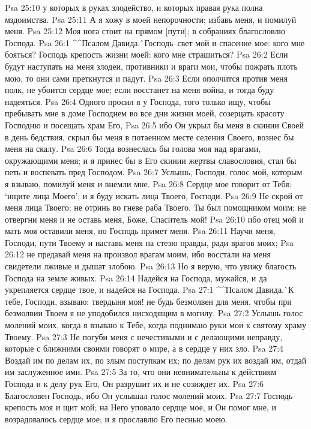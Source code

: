 Psa 25:10  у которых в руках злодейство, и которых правая рука полна мздоимства.
Psa 25:11  А я хожу в моей непорочности; избавь меня, и помилуй меня.
Psa 25:12  Моя нога стоит на прямом [пути]; в собраниях благословлю Господа.
Psa 26:1  ^^Псалом Давида.^^ Господь--свет мой и спасение мое: кого мне бояться? Господь крепость жизни моей: кого мне страшиться?
Psa 26:2  Если будут наступать на меня злодеи, противники и враги мои, чтобы пожрать плоть мою, то они сами преткнутся и падут.
Psa 26:3  Если ополчится против меня полк, не убоится сердце мое; если восстанет на меня война, и тогда буду надеяться.
Psa 26:4  Одного просил я у Господа, того только ищу, чтобы пребывать мне в доме Господнем во все дни жизни моей, созерцать красоту Господню и посещать храм Его,
Psa 26:5  ибо Он укрыл бы меня в скинии Своей в день бедствия, скрыл бы меня в потаенном месте селения Своего, вознес бы меня на скалу.
Psa 26:6  Тогда вознеслась бы голова моя над врагами, окружающими меня; и я принес бы в Его скинии жертвы славословия, стал бы петь и воспевать пред Господом.
Psa 26:7  Услышь, Господи, голос мой, которым я взываю, помилуй меня и внемли мне.
Psa 26:8  Сердце мое говорит от Тебя: `ищите лица Моего'; и я буду искать лица Твоего, Господи.
Psa 26:9  Не скрой от меня лица Твоего; не отринь во гневе раба Твоего. Ты был помощником моим; не отвергни меня и не оставь меня, Боже, Спаситель мой!
Psa 26:10  ибо отец мой и мать моя оставили меня, но Господь примет меня.
Psa 26:11  Научи меня, Господи, пути Твоему и наставь меня на стезю правды, ради врагов моих;
Psa 26:12  не предавай меня на произвол врагам моим, ибо восстали на меня свидетели лживые и дышат злобою.
Psa 26:13  Но я верую, что увижу благость Господа на земле живых.
Psa 26:14  Надейся на Господа, мужайся, и да укрепляется сердце твое, и надейся на Господа.
Psa 27:1  ^^Псалом Давида.^^ К тебе, Господи, взываю: твердыня моя! не будь безмолвен для меня, чтобы при безмолвии Твоем я не уподобился нисходящим в могилу.
Psa 27:2  Услышь голос молений моих, когда я взываю к Тебе, когда поднимаю руки мои к святому храму Твоему.
Psa 27:3  Не погуби меня с нечестивыми и с делающими неправду, которые с ближними своими говорят о мире, а в сердце у них зло.
Psa 27:4  Воздай им по делам их, по злым поступкам их; по делам рук их воздай им, отдай им заслуженное ими.
Psa 27:5  За то, что они невнимательны к действиям Господа и к делу рук Его, Он разрушит их и не созиждет их.
Psa 27:6  Благословен Господь, ибо Он услышал голос молений моих.
Psa 27:7  Господь--крепость моя и щит мой; на Него уповало сердце мое, и Он помог мне, и возрадовалось сердце мое; и я прославлю Его песнью моею.
